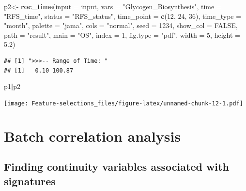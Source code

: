 \documentclass[
  12pt,
]{book}
\newenvironment{Shaded}{\begin{snugshade}}{\end{snugshade}}
\newcommand{\AttributeTok}[1]{\textcolor[rgb]{0.13,0.29,0.53}{#1}}
\newcommand{\ConstantTok}[1]{\textcolor[rgb]{0.56,0.35,0.01}{#1}}
\newcommand{\DecValTok}[1]{\textcolor[rgb]{0.00,0.00,0.81}{#1}}
\newcommand{\FloatTok}[1]{\textcolor[rgb]{0.00,0.00,0.81}{#1}}
\newcommand{\FunctionTok}[1]{\textcolor[rgb]{0.13,0.29,0.53}{\textbf{#1}}}
\newcommand{\NormalTok}[1]{#1}
\newcommand{\OtherTok}[1]{\textcolor[rgb]{0.56,0.35,0.01}{#1}}
\newcommand{\SpecialCharTok}[1]{\textcolor[rgb]{0.81,0.36,0.00}{\textbf{#1}}}
\newcommand{\StringTok}[1]{\textcolor[rgb]{0.31,0.60,0.02}{#1}}
\begin{document}
\begin{Shaded}
\begin{Highlighting}[]
\NormalTok{p2}\OtherTok{\textless{}{-}} \FunctionTok{roc\_time}\NormalTok{(}\AttributeTok{input      =}\NormalTok{ input,  }
             \AttributeTok{vars       =} \StringTok{"Glycogen\_Biosynthesis"}\NormalTok{, }
             \AttributeTok{time       =} \StringTok{"RFS\_time"}\NormalTok{,}
             \AttributeTok{status     =} \StringTok{"RFS\_status"}\NormalTok{, }
             \AttributeTok{time\_point =} \FunctionTok{c}\NormalTok{(}\DecValTok{12}\NormalTok{, }\DecValTok{24}\NormalTok{, }\DecValTok{36}\NormalTok{), }
             \AttributeTok{time\_type  =} \StringTok{"month"}\NormalTok{,}
             \AttributeTok{palette    =} \StringTok{"jama"}\NormalTok{,}
             \AttributeTok{cols       =} \StringTok{"normal"}\NormalTok{,}
             \AttributeTok{seed       =} \DecValTok{1234}\NormalTok{, }
             \AttributeTok{show\_col   =} \ConstantTok{FALSE}\NormalTok{, }
             \AttributeTok{path       =} \StringTok{"result"}\NormalTok{, }
             \AttributeTok{main       =} \StringTok{"OS"}\NormalTok{,}
             \AttributeTok{index      =} \DecValTok{1}\NormalTok{,}
             \AttributeTok{fig.type   =} \StringTok{"pdf"}\NormalTok{,}
             \AttributeTok{width      =} \DecValTok{5}\NormalTok{,}
             \AttributeTok{height     =} \FloatTok{5.2}\NormalTok{)}
\end{Highlighting}
\end{Shaded}

\begin{verbatim}
## [1] ">>>-- Range of Time: "
## [1]   0.10 100.87
\end{verbatim}

\begin{Shaded}
\begin{Highlighting}[]
\NormalTok{p1}\SpecialCharTok{|}\NormalTok{p2}
\end{Highlighting}
\end{Shaded}

\texttt{[image: Feature-selections\_files/figure-latex/unnamed-chunk-12-1.pdf]}

\hypertarget{batch-correlation-analysis}{%
\section{Batch correlation analysis}\label{batch-correlation-analysis}}

\hypertarget{finding-continuity-variables-associated-with-signatures}{%
\subsection{Finding continuity variables associated with signatures}\label{finding-continuity-variables-associated-with-signatures}}
\end{document}
